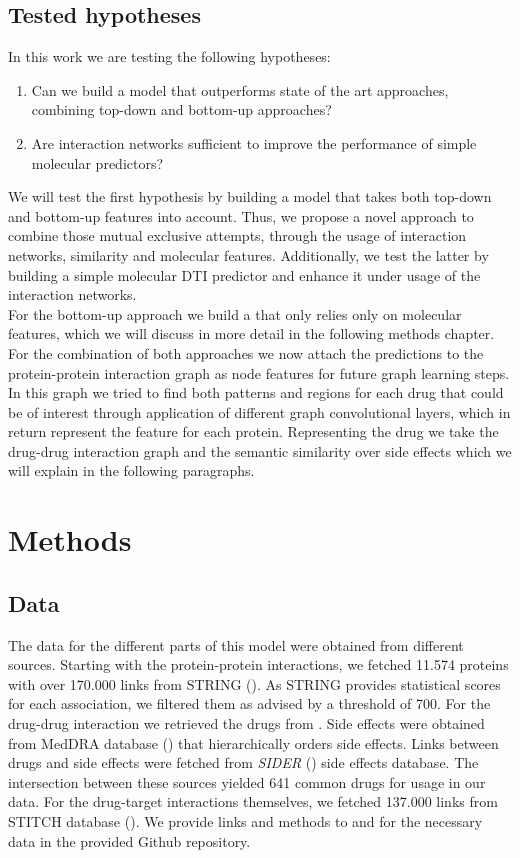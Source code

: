 \documentclass{bioinfo}
\begin{document}
\subsection{Tested hypotheses}

In this work we are testing the following hypotheses:
\begin{enumerate}
	\item Can we build a model that outperforms state of the art approaches, combining top-down and bottom-up approaches?
	\item Are interaction networks sufficient to improve the performance of simple molecular predictors?
\end{enumerate}
We will test the first hypothesis by building a model that takes both top-down and bottom-up features into account. Thus, we propose a novel approach to combine those mutual exclusive attempts, through the usage of interaction networks, similarity and molecular features. Additionally, we test the latter by building a simple molecular DTI predictor and enhance it under usage of the interaction networks.\\

For the bottom-up approach we build a that only relies only on molecular features, which we will discuss in more detail in the following methods chapter. For the combination of both approaches we now attach the predictions to the protein-protein interaction graph as node features for future graph learning steps. In this graph we tried to find both patterns and regions for each drug that could be of interest through application of different graph convolutional layers, which in return represent the feature for each protein. Representing the drug we take the drug-drug interaction graph and the semantic similarity over side effects which we will explain in the following paragraphs.

\section{Methods}
\subsection{Data}
The data for the different parts of this model were obtained from different sources. Starting with the protein-protein interactions, we fetched 11.574 proteins with over 170.000 links from STRING (\cite{STRINGv10}). As STRING provides statistical scores for each association, we filtered them as advised by a threshold of 700. For the drug-drug interaction we retrieved the drugs from \cite{Boyce2015}. Side effects were obtained from MedDRA database (\cite{MedDRA}) that hierarchically orders side effects. Links between drugs and side effects were fetched from \textit{SIDER} (\cite{SIDER}) side effects database. The intersection between these sources yielded 641 common drugs for usage in our data. For the drug-target interactions themselves, we fetched 
137.000 links from STITCH database (\cite{STITCHv5}). We provide links and methods to and for the necessary data in the provided Github repository.\\
\end{document}
